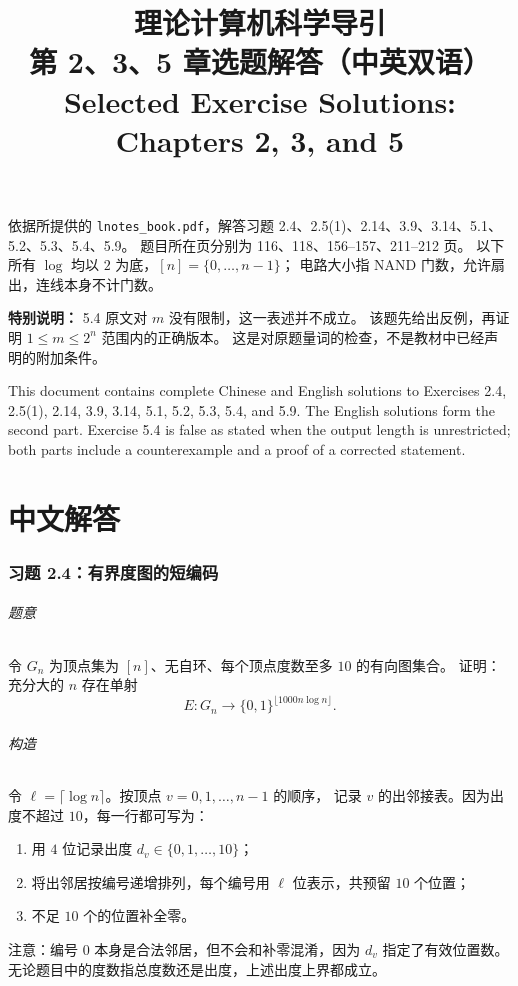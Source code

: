 \documentclass[UTF8,fontset=fandol,11pt,a4paper]{ctexart}
\title{理论计算机科学导引\\第 2、3、5 章选题解答（中英双语）\\
\large Selected Exercise Solutions: Chapters 2, 3, and 5}
\author{}
\date{}
\newcommand{\bits}{\{0,1\}}
\begin{document}
\maketitle
\vspace{-2em}
\noindent
依据所提供的 \texttt{lnotes\_book.pdf}，解答习题
2.4、2.5(1)、2.14、3.9、3.14、5.1、5.2、5.3、5.4、5.9。
题目所在页分别为 116、118、156--157、211--212 页。
以下所有 $\log$ 均以 $2$ 为底，$[n]=\{0,\ldots,n-1\}$；
电路大小指 NAND 门数，允许扇出，连线本身不计门数。

\medskip
\noindent\textbf{特别说明：}
5.4 原文对 $m$ 没有限制，这一表述并不成立。
该题先给出反例，再证明 $1\le m\le 2^n$ 范围内的正确版本。
这是对原题量词的检查，不是教材中已经声明的附加条件。

\medskip
\noindent
This document contains complete Chinese and English solutions to Exercises
2.4, 2.5(1), 2.14, 3.9, 3.14, 5.1, 5.2, 5.3, 5.4, and 5.9.
The English solutions form the second part. Exercise 5.4 is false as stated
when the output length is unrestricted; both parts include a counterexample
and a proof of a corrected statement.

\tableofcontents

\clearpage
{}
{}
\part*{中文解答}

\section{习题 2.4：有界度图的短编码}

\paragraph{题意}
令 $G_n$ 为顶点集为 $[n]$、无自环、每个顶点度数至多 $10$ 的有向图集合。
证明：充分大的 $n$ 存在单射
\[
 E:G_n\longrightarrow\bits^{\lfloor1000n\log n\rfloor}.
\]

\paragraph{构造}
令 $\ell=\lceil\log n\rceil$。按顶点 $v=0,1,\ldots,n-1$ 的顺序，
记录 $v$ 的出邻接表。因为出度不超过 $10$，每一行都可写为：
\begin{enumerate}
 \item 用 $4$ 位记录出度 $d_v\in\{0,1,\ldots,10\}$；
 \item 将出邻居按编号递增排列，每个编号用 $\ell$ 位表示，共预留 $10$ 个位置；
 \item 不足 $10$ 个的位置补全零。
\end{enumerate}
注意：编号 $0$ 本身是合法邻居，但不会和补零混淆，因为 $d_v$ 指定了有效位置数。
无论题目中的度数指总度数还是出度，上述出度上界都成立。
\end{document}
